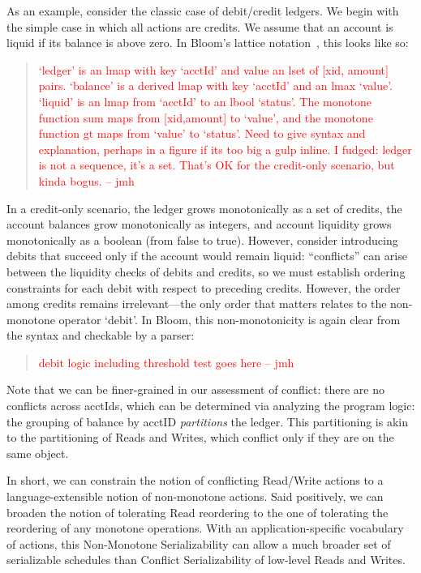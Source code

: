\documentclass{sig-alternate}
\newcommand{\jmh}[1]{{\textcolor{red}{#1 -- jmh}}}
\begin{document}
As an example, consider the classic case of debit/credit ledgers.  We begin with
the simple case in which all actions are credits. We assume that an account is
liquid if its balance is above zero. In Bloom's lattice notation~\cite{Conway2012},
this looks like so:
\begin{quote}
  \jmh{`ledger' is an lmap with key `acctId' and value an lset of [xid, amount]
    pairs.  `balance' is a derived lmap with key `acctId' and an lmax `value'.
    `liquid' is an lmap from `acctId' to an lbool `status'.  The monotone
    function sum maps from [xid,amount] to `value', and the monotone function gt
    maps from `value' to `status'. Need to give syntax and explanation, perhaps
    in a figure if its too big a gulp inline.  I fudged: ledger is not a
    sequence, it's a set.  That's OK for the credit-only scenario, but kinda
    bogus.}
\end{quote}
In a credit-only scenario, the ledger grows monotonically as a set of credits,
the account balances grow monotonically as integers, and account liquidity grows
monotonically as a boolean (from false to true).  However, consider introducing
debits that succeed only if the account would remain liquid: ``conflicts'' can
arise between the liquidity checks of debits and credits, so we must establish
ordering constraints for each debit with respect to preceding credits.  However,
the order among credits remains irrelevant---the only order that matters relates
to the non-monotone operator `debit'.  In Bloom, this non-monotonicity is again
clear from the syntax and checkable by a parser:
\begin{quote}
	\jmh{debit logic including threshold test goes here}
\end{quote}
Note that we can be finer-grained in our assessment of conflict: there are no
conflicts across acctIds, which can be determined via analyzing the program
logic: the grouping of balance by acctID \emph{partitions} the ledger.  This
partitioning is akin to the partitioning of Reads and Writes, which conflict
only if they are on the same object.

In short, we can constrain the notion of conflicting Read/Write actions to a
language-extensible notion of non-monotone actions.  Said positively, we can
broaden the notion of tolerating Read reordering to the one of tolerating the
reordering of any monotone operations.  With an application-specific vocabulary
of actions, this Non-Monotone Serializability can allow a much broader set of
serializable schedules than Conflict Serializability of low-level Reads and
Writes.
\end{document}
